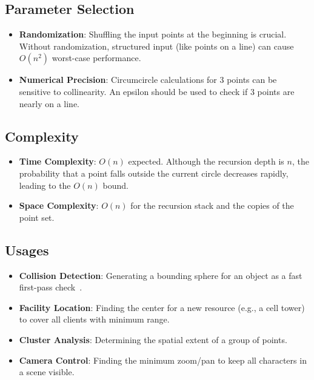 \subsection{Parameter Selection}
\begin{itemize}
    \item \textbf{Randomization}: Shuffling the input points at the beginning is crucial. Without randomization, structured input (like points on a line) can cause $O(n^2)$ worst-case performance.
    \item \textbf{Numerical Precision}: Circumcircle calculations for 3 points can be sensitive to collinearity. An epsilon should be used to check if 3 points are nearly on a line.
\end{itemize}

\subsection{Complexity}
\begin{itemize}
    \item \textbf{Time Complexity}: $O(n)$ expected. Although the recursion depth is $n$, the probability that a point falls outside the current circle decreases rapidly, leading to the $O(n)$ bound.
    \item \textbf{Space Complexity}: $O(n)$ for the recursion stack and the copies of the point set.
\end{itemize}

\subsection{Usages}
\begin{itemize}
    \item \textbf{Collision Detection}: Generating a bounding sphere for an object as a fast first-pass check~\cite{ericson2004}.
    \item \textbf{Facility Location}: Finding the center for a new resource (e.g., a cell tower) to cover all clients with minimum range.
    \item \textbf{Cluster Analysis}: Determining the spatial extent of a group of points.
    \item \textbf{Camera Control}: Finding the minimum zoom/pan to keep all characters in a scene visible.
\end{itemize}

